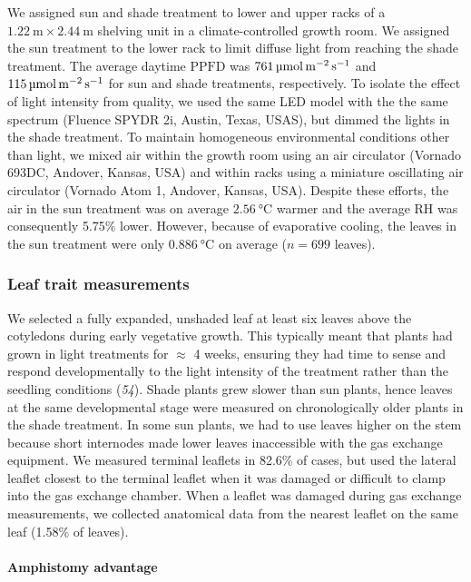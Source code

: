 \documentclass[
  letterpaper,
  DIV=11,
  numbers=noendperiod]{scrartcl}
\let\oldparagraph\paragraph
\renewcommand{\paragraph}[1]{\oldparagraph{#1}\mbox{}}
\newcommand{\ppfd}{$\mathrm{PPFD}$}
\newcommand{\ppfdqty}[1]{$\qty{#1}{\micro\mol\raiseto{-2}\meter\raiseto{-1}\second}$}
\begin{document}
We assigned sun and shade treatment to lower and upper racks of a
\(\qty{1.22}{\meter} \times \qty{2.44}{\meter}\) shelving unit in a
climate-controlled growth room. We assigned the sun treatment to the
lower rack to limit diffuse light from reaching the shade treatment. The
average daytime \ppfd{} was \ppfdqty{761} and \ppfdqty{115} for sun and
shade treatments, respectively. To isolate the effect of light intensity
from quality, we used the same LED model with the the same spectrum
(Fluence SPYDR 2i, Austin, Texas, USAS), but dimmed the lights in the
shade treatment. To maintain homogeneous environmental conditions other
than light, we mixed air within the growth room using an air circulator
(Vornado 693DC, Andover, Kansas, USA) and within racks using a miniature
oscillating air circulator (Vornado Atom 1, Andover, Kansas, USA).
Despite these efforts, the air in the sun treatment was on average
\(\qty{2.56}{\degreeCelsius}\) warmer and the average RH was
consequently 5.75\% lower. However, because of evaporative cooling, the
leaves in the sun treatment were only \(\qty{0.886}{\degreeCelsius}\) on
average (\(n = 699\) leaves).

\subsubsection{Leaf trait measurements}\label{leaf-trait-measurements}

We selected a fully expanded, unshaded leaf at least six leaves above
the cotyledons during early vegetative growth. This typically meant that
plants had grown in light treatments for \(\approx\) 4 weeks, ensuring
they had time to sense and respond developmentally to the light
intensity of the treatment rather than the seedling conditions
(\emph{54}). Shade plants grew slower than sun plants, hence leaves at
the same developmental stage were measured on chronologically older
plants in the shade treatment. In some sun plants, we had to use leaves
higher on the stem because short internodes made lower leaves
inaccessible with the gas exchange equipment. We measured terminal
leaflets in 82.6\% of cases, but used the lateral leaflet closest to the
terminal leaflet when it was damaged or difficult to clamp into the gas
exchange chamber. When a leaflet was damaged during gas exchange
measurements, we collected anatomical data from the nearest leaflet on
the same leaf (1.58\% of leaves).

\paragraph{Amphistomy advantage}\label{amphistomy-advantage}
\end{document}
